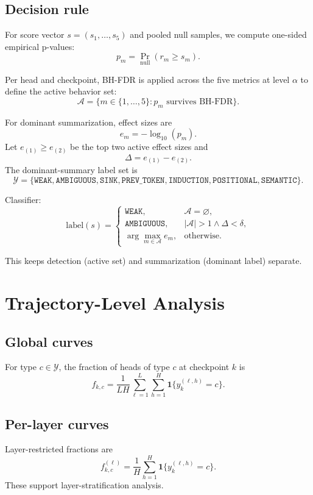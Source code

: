 \documentclass[11pt]{article}
\newcommand{\1}{\mathbf{1}}
\begin{document}
\subsection{Decision rule}

For score vector $s=(s_1,\dots,s_5)$ and pooled null samples, we compute
one-sided empirical p-values:
\[
p_m = \Pr_{\mathrm{null}}(r_m \ge s_m).
\]

Per head and checkpoint, BH-FDR is applied across the five metrics at level
$\alpha$ to define the active behavior set:
\[
\mathcal{A} = \{m \in \{1,\dots,5\} : p_m \text{ survives BH-FDR}\}.
\]

For dominant summarization, effect sizes are
\[
e_m = -\log_{10}(p_m).
\]
Let $e_{(1)} \ge e_{(2)}$ be the top two active effect sizes and
\[
\Delta = e_{(1)} - e_{(2)}.
\]
The dominant-summary label set is
\[
\mathcal{Y}
=
\{\texttt{WEAK},\texttt{AMBIGUOUS},\texttt{SINK},\texttt{PREV\_TOKEN},
\texttt{INDUCTION},\texttt{POSITIONAL},\texttt{SEMANTIC}\}.
\]

Classifier:
\[
\mathrm{label}(s)
=
\begin{cases}
\texttt{WEAK}, & \mathcal{A}=\varnothing, \\
\texttt{AMBIGUOUS}, & |\mathcal{A}|>1 \land \Delta < \delta, \\
\arg\max_{m \in \mathcal{A}} e_m, & \text{otherwise.}
\end{cases}
\]

This keeps detection (active set) and summarization (dominant label) separate.

\section{Trajectory-Level Analysis}

\subsection{Global curves}

For type $c \in \mathcal{Y}$, the fraction of heads of type $c$ at checkpoint
$k$ is
\[
f_{k,c}
=
\frac{1}{LH}
\sum_{\ell=1}^{L}
\sum_{h=1}^{H}
\1\{y_k^{(\ell,h)} = c\}.
\]

\subsection{Per-layer curves}

Layer-restricted fractions are
\[
f_{k,c}^{(\ell)}
=
\frac{1}{H}
\sum_{h=1}^{H}
\1\{y_k^{(\ell,h)} = c\}.
\]
These support layer-stratification analysis.
\end{document}
